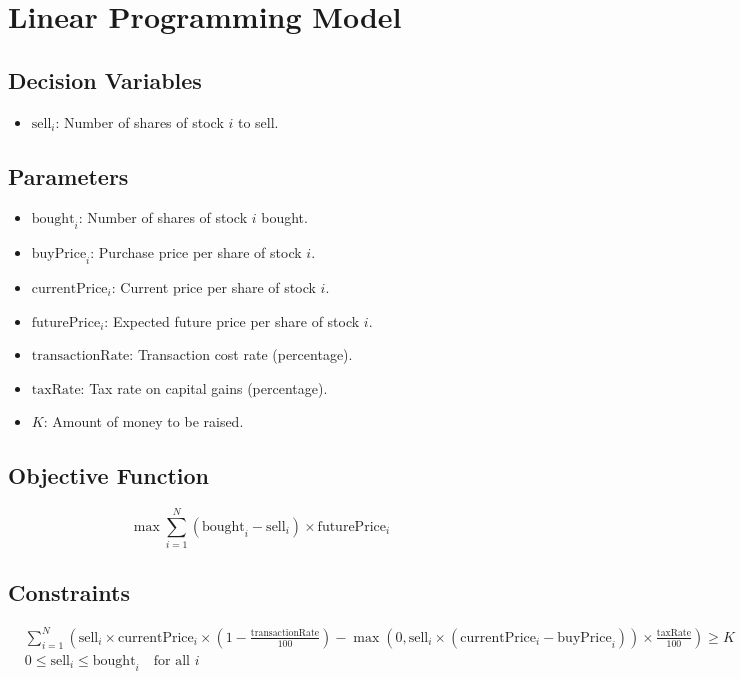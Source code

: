 \documentclass{article}
\begin{document}
\section*{Linear Programming Model}

\subsection*{Decision Variables}
\begin{itemize}
    \item $\text{sell}_i$: Number of shares of stock $i$ to sell.
\end{itemize}

\subsection*{Parameters}
\begin{itemize}
    \item $\text{bought}_i$: Number of shares of stock $i$ bought.
    \item $\text{buyPrice}_i$: Purchase price per share of stock $i$.
    \item $\text{currentPrice}_i$: Current price per share of stock $i$.
    \item $\text{futurePrice}_i$: Expected future price per share of stock $i$.
    \item $\text{transactionRate}$: Transaction cost rate (percentage).
    \item $\text{taxRate}$: Tax rate on capital gains (percentage).
    \item $K$: Amount of money to be raised.
\end{itemize}

\subsection*{Objective Function}
\begin{equation}
    \max \sum_{i=1}^{N} \left(\text{bought}_i - \text{sell}_i\right) \times \text{futurePrice}_i
\end{equation}

\subsection*{Constraints}
\begin{align}
    &\sum_{i=1}^{N} \left(\text{sell}_i \times \text{currentPrice}_i \times \left(1 - \frac{\text{transactionRate}}{100}\right) - \max(0, \text{sell}_i \times (\text{currentPrice}_i - \text{buyPrice}_i)) \times \frac{\text{taxRate}}{100}\right) \geq K \\
    &0 \leq \text{sell}_i \leq \text{bought}_i \quad \text{for all } i
\end{align}
\end{document}
